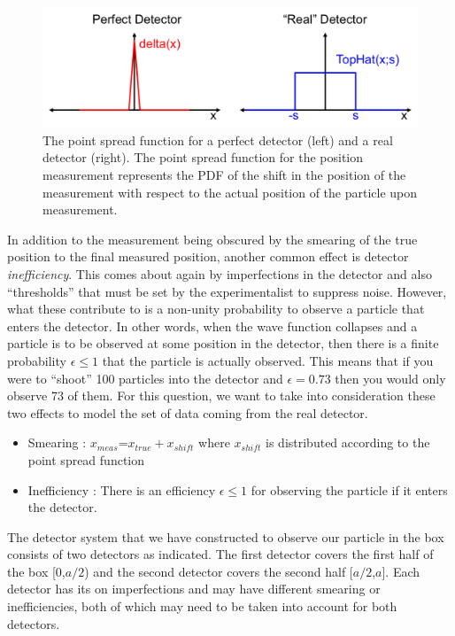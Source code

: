 \documentclass[12pt]{article}
\begin{document}
\begin{figure}[h!]
  \center
  \includegraphics[width=0.8\linewidth]{detector.png}
  \caption{The point spread function for a perfect detector (left) and a real detector (right).  The point spread function for the position measurement represents the PDF of the shift in the position of the measurement with respect to the actual position of the particle upon measurement.}
  \label{fig:riemann}
\end{figure}
\newline
\newline
In addition to the measurement being obscured by the smearing of the true position to the final measured position, another common effect is detector \textit{inefficiency}.  This comes about again by imperfections in the detector and also ``thresholds'' that must be set by the experimentalist to suppress noise.  However, what these contribute to is a non-unity probability to observe a particle that enters the detector.  In other words, when the wave function collapses and a particle is to be observed at some position in the detector, then there is a finite probability $\epsilon\leq 1$ that the particle is actually observed.  This means that if you were to ``shoot'' 100 particles into the detector and $\epsilon=0.73$ then you would only observe 73 of them.  
\newline
\newline
For this question, we want to take into consideration these two effects to model the set of data coming from the real detector.  
\begin{itemize}[noitemsep]
\item Smearing : $x_{meas}$=$x_{true}+x_{shift}$ where $x_{shift}$ is distributed according to the point spread function
\item Inefficiency : There is an efficiency $\epsilon\leq 1$ for observing the particle if it enters the detector.  
\end{itemize}
The detector system that we have constructed to observe our particle in the box consists of two detectors as indicated.  The first detector covers the first half of the box [0,$a/2$) and the second detector covers the second half [$a/2$,$a$].  Each detector has its on imperfections and may have different smearing or inefficiencies, both of which may need to be taken into account for both detectors.
\end{document}
